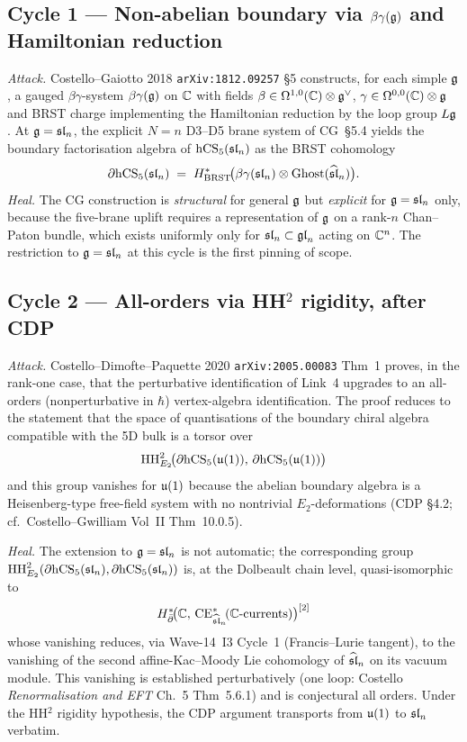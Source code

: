 \subsection{Cycle 1 --- Non-abelian boundary via $\beta\gamma(\mathfrak{g})$
  and Hamiltonian reduction}

\emph{Attack.} Costello--Gaiotto 2018 \texttt{arXiv:1812.09257} \S5
constructs, for each simple $\mathfrak{g}$, a gauged $\beta\gamma$-system
$\beta\gamma(\mathfrak{g})$ on $\mathbb{C}$ with fields
$\beta\in\Omega^{1,0}(\mathbb{C})\otimes\mathfrak{g}^\vee$,
$\gamma\in\Omega^{0,0}(\mathbb{C})\otimes\mathfrak{g}$ and BRST charge implementing
the Hamiltonian reduction by the loop group $L\mathfrak{g}$. At $\mathfrak{g}=\mathfrak{sl}_n$,
the explicit $N=n$ D3--D5 brane system of CG~\S5.4 yields the
boundary factorisation algebra of $\mathrm{hCS}_5(\mathfrak{sl}_n)$ as the
BRST cohomology
\[
  \partial\mathrm{hCS}_5(\mathfrak{sl}_n)
  \;=\;
  H^\ast_{\mathrm{BRST}}\!\bigl(\beta\gamma(\mathfrak{sl}_n)\otimes
  \mathrm{Ghost}(\widehat{\mathfrak{sl}}_n)\bigr).
\]
\emph{Heal.} The CG construction is \emph{structural} for general
$\mathfrak{g}$ but \emph{explicit} for $\mathfrak{g}=\mathfrak{sl}_n$ only, because the five-brane
uplift requires a representation of $\mathfrak{g}$ on a rank-$n$ Chan--Paton
bundle, which exists uniformly only for $\mathfrak{sl}_n\subset\mathfrak{gl}_n$
acting on $\mathbb{C}^n$. The restriction to $\mathfrak{g}=\mathfrak{sl}_n$ at this cycle is the
first pinning of scope.

\subsection{Cycle 2 --- All-orders via HH${}^2$ rigidity, after CDP}

\emph{Attack.} Costello--Dimofte--Paquette 2020
\texttt{arXiv:2005.00083} Thm~1 proves, in the rank-one case, that
the perturbative identification of Link~4 upgrades to an all-orders
(nonperturbative in $\hbar$) vertex-algebra identification. The
proof reduces to the statement that the space of quantisations of
the boundary chiral algebra compatible with the 5D bulk is a
torsor over
\[
  \mathrm{HH}^2_{E_2}\!\bigl(\partial\mathrm{hCS}_5(\mathfrak{u}(1)),\,\partial\mathrm{hCS}_5(\mathfrak{u}(1))\bigr)
\]
and this group vanishes for $\mathfrak{u}(1)$ because the abelian boundary
algebra is a Heisenberg-type free-field system with no nontrivial
$E_2$-deformations (CDP \S4.2; cf.\ Costello--Gwilliam Vol~II
Thm~10.0.5).

\emph{Heal.} The extension to $\mathfrak{g}=\mathfrak{sl}_n$ is not automatic; the
corresponding group $\mathrm{HH}^2_{E_2}(\partial\mathrm{hCS}_5(\mathfrak{sl}_n),
\partial\mathrm{hCS}_5(\mathfrak{sl}_n))$ is, at the Dolbeault chain level,
quasi-isomorphic to
\[
  H^\ast_{\bar\partial}\!\bigl(\mathbb{C},\,
  \mathrm{CE}^\ast_{\widehat{\mathfrak{sl}}_n}\!(\mathbb{C}\text{-currents})\bigr)^{[2]}
\]
whose vanishing reduces, via Wave-14~I3 Cycle~1 (Francis--Lurie
tangent), to the vanishing of the second affine-Kac--Moody Lie
cohomology of $\widehat{\mathfrak{sl}}_n$ on its vacuum module. This vanishing is
established perturbatively (one loop: Costello
\emph{Renormalisation and EFT} Ch.~5 Thm~5.6.1) and is
conjectural all orders. Under the HH${}^2$ rigidity hypothesis,
the CDP argument transports from $\mathfrak{u}(1)$ to $\mathfrak{sl}_n$ verbatim.

